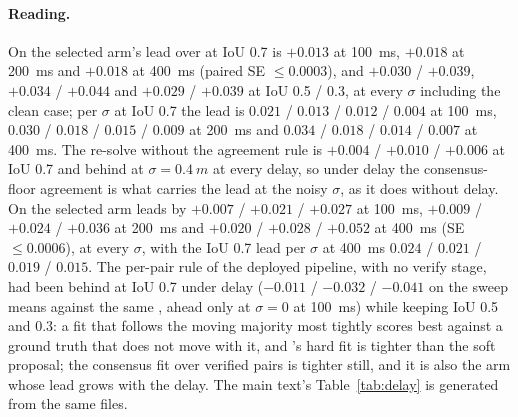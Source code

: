 \paragraph{Reading.}
On \vxreal the selected arm's lead over \freealign at IoU 0.7 is $+0.013$ at \SI{100}{ms}, $+0.018$ at \SI{200}{ms} and $+0.018$ at \SI{400}{ms} (paired SE $\le 0.0003$), and $+0.030$ / $+0.039$, $+0.034$ / $+0.044$ and $+0.029$ / $+0.039$ at IoU 0.5 / 0.3, at every $\sigma$ including the clean case; per $\sigma$ at IoU 0.7 the lead is $0.021$ / $0.013$ / $0.012$ / $0.004$ at \SI{100}{ms}, $0.030$ / $0.018$ / $0.015$ / $0.009$ at \SI{200}{ms} and $0.034$ / $0.018$ / $0.014$ / $0.007$ at \SI{400}{ms}. The re-solve without the agreement rule is $+0.004$ / $+0.010$ / $+0.006$ at IoU 0.7 and behind \freealign at $\sigma=\SI{0.4}{m}$ at every delay, so under delay the consensus-floor agreement is what carries the lead at the noisy $\sigma$, as it does without delay. On \opvv the selected arm leads by $+0.007$ / $+0.021$ / $+0.027$ at \SI{100}{ms}, $+0.009$ / $+0.024$ / $+0.036$ at \SI{200}{ms} and $+0.020$ / $+0.028$ / $+0.052$ at \SI{400}{ms} (SE $\le 0.0006$), at every $\sigma$, with the IoU 0.7 lead per $\sigma$ at \SI{400}{ms} $0.024$ / $0.021$ / $0.019$ / $0.015$. The per-pair rule of the deployed pipeline, with no verify stage, had been behind at IoU 0.7 under delay ($-0.011$ / $-0.032$ / $-0.041$ on the sweep means against the same \freealign, ahead only at $\sigma{=}0$ at \SI{100}{ms}) while keeping IoU 0.5 and 0.3: a fit that follows the moving majority most tightly scores best against a ground truth that does not move with it, and \freealign's hard fit is tighter than the soft proposal; the consensus fit over verified pairs is tighter still, and it is also the arm whose lead grows with the delay. The main text's Table~\ref{tab:delay} is generated from the same files.
